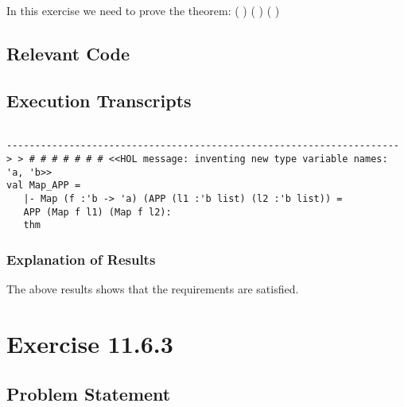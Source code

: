 \documentclass{report}
\begin{document}
In this exercise we need to prove the theorem:
\HOLTokenTurnstile{}   (  ) \HOLSymConst{=}  (  ) (  )

\section{Relevant Code}
\label{sec:relevant-code-2}



\section{Execution Transcripts}
\label{sec:exec-transcr-2}

\setcounter{sessioncount}{0}
\begin{session}
  \begin{scriptsize}
\begin{verbatim}

---------------------------------------------------------------------
> > # # # # # # # <<HOL message: inventing new type variable names: 'a, 'b>>
val Map_APP =
   |- Map (f :'b -> 'a) (APP (l1 :'b list) (l2 :'b list)) =
   APP (Map f l1) (Map f l2):
   thm

\end{verbatim}
  \end{scriptsize}
\end{session}

\subsection{Explanation of Results}
\label{sec:explanation-results-2}
The above results shows that the requirements are satisfied.



 \chapter{Exercise 11.6.3}
 \label{cha:exercise-11.6.3}
  
 \section{Problem Statement}
 \label{sec:problem-statement-3}
\end{document}
